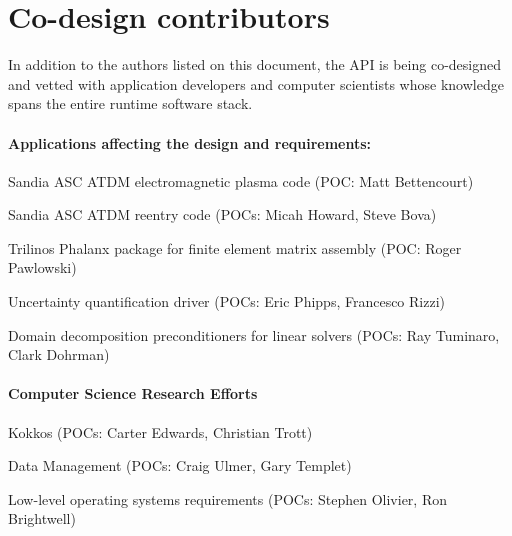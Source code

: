 

\section{Co-design contributors}
In addition to the authors listed on this document,
the \gls{API} is being \gls{co-design}ed and vetted with application developers
and computer scientists whose knowledge spans the entire runtime software stack.

\paragraph{Applications affecting the design and requirements:}
\begin{compactitem}
\item Sandia \gls{ASC} \gls{ATDM} electromagnetic plasma code (POC: Matt Bettencourt)
\item Sandia \gls{ASC} \gls{ATDM} reentry code (POCs: Micah Howard, Steve Bova)
\item \gls{Trilinos} Phalanx package for finite element matrix assembly (POC: Roger Pawlowski)
\item Uncertainty quantification driver (POCs: Eric Phipps, Francesco Rizzi)
\item Domain decomposition preconditioners for linear solvers (POCs: Ray Tuminaro, Clark Dohrman)
\end{compactitem}
 
\paragraph{Computer Science Research Efforts}
\begin{compactitem}
\item Kokkos (POCs: Carter Edwards, Christian Trott)
\item Data Management (POCs: Craig Ulmer, Gary Templet)
\item Low-level operating systems requirements (POCs: Stephen Olivier, Ron
    Brightwell)
\end{compactitem}



